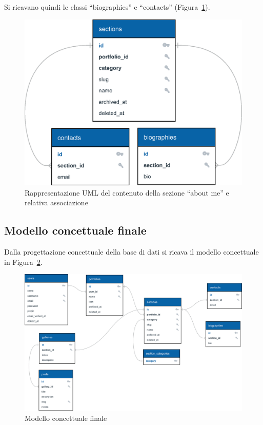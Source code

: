 Si ricavano quindi le classi ``biographies'' e ``contacts'' (Figura~\ref{fig:about_me_db}).
\begin{figure}[H]
	\centering
	\includegraphics[width=0.7\linewidth]{figure/about_me_db}
	\caption{Rappresentazione UML del contenuto della sezione ``about me'' e relativa associazione}
	\label{fig:about_me_db}
\end{figure}

\subsection{Modello concettuale finale}
Dalla progettazione concettuale della base di dati si ricava il modello concettuale in Figura~\ref{fig:db}.

\begin{figure}
	\centering
	\includegraphics[width=0.9\linewidth]{figure/db}
	\caption{Modello concettuale finale}
	\label{fig:db}
\end{figure}


